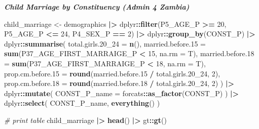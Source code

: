 \documentclass[
]{article}
\newenvironment{Shaded}{\begin{snugshade}}{\end{snugshade}}
\newcommand{\AttributeTok}[1]{\textcolor[rgb]{0.13,0.29,0.53}{#1}}
\newcommand{\CommentTok}[1]{\textcolor[rgb]{0.56,0.35,0.01}{\textit{#1}}}
\newcommand{\DecValTok}[1]{\textcolor[rgb]{0.00,0.00,0.81}{#1}}
\newcommand{\FloatTok}[1]{\textcolor[rgb]{0.00,0.00,0.81}{#1}}
\newcommand{\FunctionTok}[1]{\textcolor[rgb]{0.13,0.29,0.53}{\textbf{#1}}}
\newcommand{\NormalTok}[1]{#1}
\newcommand{\OtherTok}[1]{\textcolor[rgb]{0.56,0.35,0.01}{#1}}
\newcommand{\SpecialCharTok}[1]{\textcolor[rgb]{0.81,0.36,0.00}{\textbf{#1}}}
\begin{document}
\textbf{\emph{Child Marriage by Constituency (Admin 4 Zambia)}}

\begin{Shaded}
\begin{Highlighting}[]
\NormalTok{child\_marriage }\OtherTok{\textless{}{-}} 
\NormalTok{  demographics }\SpecialCharTok{|\textgreater{}}
\NormalTok{  dplyr}\SpecialCharTok{::}\FunctionTok{filter}\NormalTok{(P5\_AGE\_P }\SpecialCharTok{\textgreater{}=} \DecValTok{20}\NormalTok{, P5\_AGE\_P }\SpecialCharTok{\textless{}=} \DecValTok{24}\NormalTok{, P4\_SEX\_P }\SpecialCharTok{==} \DecValTok{2}\NormalTok{) }\SpecialCharTok{|\textgreater{}}
\NormalTok{  dplyr}\SpecialCharTok{::}\FunctionTok{group\_by}\NormalTok{(CONST\_P) }\SpecialCharTok{|\textgreater{}}
\NormalTok{  dplyr}\SpecialCharTok{::}\FunctionTok{summarise}\NormalTok{(}
    \AttributeTok{total.girls.20\_24 =} \FunctionTok{n}\NormalTok{(),}
    \AttributeTok{married.before.15 =} \FunctionTok{sum}\NormalTok{(P37\_AGE\_FIRST\_MARRAIGE\_P }\SpecialCharTok{\textless{}} \DecValTok{15}\NormalTok{, }\AttributeTok{na.rm =}\NormalTok{ T),}
    \AttributeTok{married.before.18 =} \FunctionTok{sum}\NormalTok{(P37\_AGE\_FIRST\_MARRAIGE\_P }\SpecialCharTok{\textless{}} \DecValTok{18}\NormalTok{, }\AttributeTok{na.rm =}\NormalTok{ T),}
    \AttributeTok{prop.cm.before.15 =} \FunctionTok{round}\NormalTok{(married.before}\FloatTok{.15} \SpecialCharTok{/}\NormalTok{ total.girls}\FloatTok{.20}\NormalTok{\_24, }\DecValTok{2}\NormalTok{),}
    \AttributeTok{prop.cm.before.18 =} \FunctionTok{round}\NormalTok{(married.before}\FloatTok{.18} \SpecialCharTok{/}\NormalTok{ total.girls}\FloatTok{.20}\NormalTok{\_24, }\DecValTok{2}\NormalTok{)}
\NormalTok{  ) }\SpecialCharTok{|\textgreater{}}
\NormalTok{  dplyr}\SpecialCharTok{::}\FunctionTok{mutate}\NormalTok{(}
    \AttributeTok{CONST\_P\_name =}\NormalTok{ forcats}\SpecialCharTok{::}\FunctionTok{as\_factor}\NormalTok{(CONST\_P)}
\NormalTok{  ) }\SpecialCharTok{|\textgreater{}}
\NormalTok{  dplyr}\SpecialCharTok{::}\FunctionTok{select}\NormalTok{(}
\NormalTok{    CONST\_P\_name,}
    \FunctionTok{everything}\NormalTok{()}
\NormalTok{  )}

\CommentTok{\# print table}
\NormalTok{child\_marriage }\SpecialCharTok{|\textgreater{}}
  \FunctionTok{head}\NormalTok{() }\SpecialCharTok{|\textgreater{}}
\NormalTok{  gt}\SpecialCharTok{::}\FunctionTok{gt}\NormalTok{()}
\end{Highlighting}
\end{Shaded}
\end{document}
